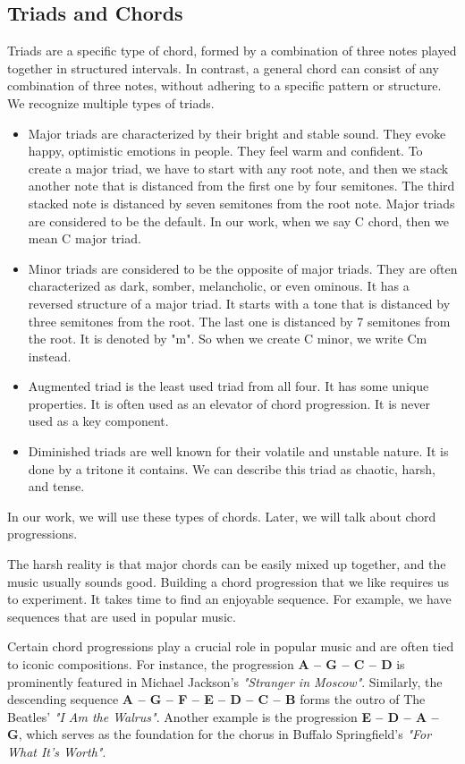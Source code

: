 \subsection*{Triads and Chords}
Triads are a specific type of chord, formed by a combination of three notes played together in structured intervals. In contrast, a general chord can consist of any combination of three notes, without adhering to a specific pattern or structure. We recognize multiple types of triads.

\begin{itemize}
    \item{Major triads are characterized by their bright and stable sound. They evoke happy, optimistic emotions in people. They feel warm and confident. To create a major triad, we have to start with any root note, and then we stack another note that is distanced from the first one by four semitones. The third stacked note is distanced by seven semitones from the root note. Major triads are considered to be the default. In our work, when we say C chord, then we mean C major triad.}
    \item{Minor triads are considered to be the opposite of major triads. They are often characterized as dark, somber, melancholic, or even ominous. It has a reversed structure of a major triad. It starts with a tone that is distanced by three semitones from the root. The last one is distanced by 7 semitones from the root. It is denoted by "m". So when we create C minor, we write Cm instead.}
    \item{Augmented triad is the least used triad from all four. It has some unique properties. It is often used as an elevator of chord progression. It is never used as a key component.}
    \item{Diminished triads are well known for their volatile and unstable nature. It is done by a tritone it contains. We can describe this triad as chaotic, harsh, and tense. }
\end{itemize}

In our work, we will use these types of chords. Later, we will talk about chord progressions. 

The harsh reality is that major chords can be easily mixed up together, and the music usually sounds good. Building a chord progression that we like requires us to experiment. It takes time to find an enjoyable sequence. For example, we have sequences that are used in popular music.

Certain chord progressions play a crucial role in popular music and are often tied to iconic compositions. 
For instance, the progression \textbf{A -- G -- C -- D} is prominently featured in Michael Jackson's \textit{"Stranger in Moscow"}. 
Similarly, the descending sequence \textbf{A -- G -- F -- E -- D -- C -- B} forms the outro of The Beatles' \textit{"I Am the Walrus"}. 
Another example is the progression \textbf{E -- D -- A -- G}, which serves as the foundation for the chorus in Buffalo Springfield's \textit{"For What It’s Worth"}.

